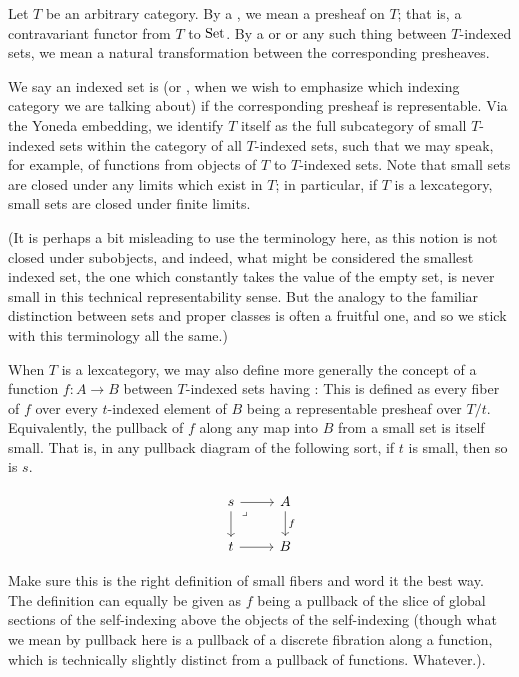 Let $T$ be an arbitrary category. By a , we mean a presheaf on $T$; that is, a contravariant functor from $T$ to $\mathrm{Set}$. By a  or  or any such thing between $T$-indexed sets, we mean a natural transformation between the corresponding presheaves.

We say an indexed set is  (or , when we wish to emphasize which indexing category we are talking about) if the corresponding presheaf is representable. Via the Yoneda embedding, we identify $T$ itself as the full subcategory of small $T$-indexed sets within the category of all $T$-indexed sets, such that we may speak, for example, of functions from objects of $T$ to $T$-indexed sets. Note that small sets are closed under any limits which exist in $T$; in particular, if $T$ is a lexcategory, small sets are closed under finite limits.

(It is perhaps a bit misleading to use the terminology  here, as this notion is not closed under subobjects, and indeed, what might be considered the smallest indexed set, the one which constantly takes the value of the empty set, is never small in this technical representability sense. But the analogy to the familiar distinction between sets and proper classes is often a fruitful one, and so we stick with this terminology all the same.)

When $T$ is a lexcategory, we may also define more generally the concept of a function $f : A \to B$ between $T$-indexed sets having : This is defined as every fiber of $f$ over every $t$-indexed element of $B$ being a representable presheaf over $T/t$. Equivalently, the pullback of $f$ along any map into $B$ from a small set is itself small. That is, in any pullback diagram of the following sort, if $t$ is small, then so is $s$.

\[\begin{tikzcd}
	s & A \\
	t & B
	\arrow["f", from=1-2, to=2-2]
	\arrow[from=2-1, to=2-2]
	\arrow[from=1-1, to=2-1]
	\arrow[from=1-1, to=1-2]
	\arrow["\lrcorner"{anchor=center, pos=0.125}, draw=none, from=1-1, to=2-2]
\end{tikzcd}\]

\begin{TODOblock}
Make sure this is the right definition of small fibers and word it the best way. The definition can equally be given as $f$ being a pullback of the slice of global sections of the self-indexing above the objects of the self-indexing (though what we mean by pullback here is a pullback of a discrete fibration along a function, which is technically slightly distinct from a pullback of functions. Whatever.).
\end{TODOblock}


